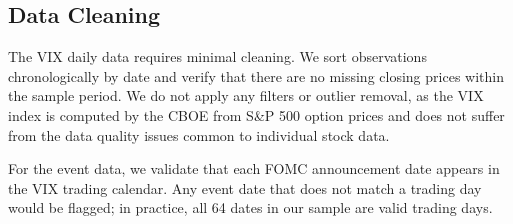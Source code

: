 \subsection{Data Cleaning}

The VIX daily data requires minimal cleaning. We sort observations chronologically by date and verify that there are no missing closing prices within the sample period. We do not apply any filters or outlier removal, as the VIX index is computed by the CBOE from S\&P 500 option prices and does not suffer from the data quality issues common to individual stock data.

For the event data, we validate that each FOMC announcement date appears in the VIX trading calendar. Any event date that does not match a trading day would be flagged; in practice, all 64 dates in our sample are valid trading days.
